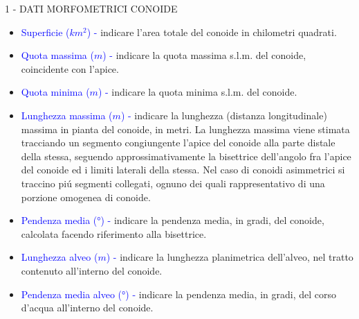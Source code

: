 \documentclass[12pt,a4paper]{article}
\begin{document}
\begin{flushleft}
\vskip 5mm
1 - DATI MORFOMETRICI CONOIDE\\

\begin{itemize}
\item{\textcolor{blue}{Superficie ($km^2$) - }} indicare l'area totale del conoide in chilometri quadrati.
\item{\textcolor{blue}{Quota massima ($m$) - }} indicare la quota massima s.l.m. del conoide, coincidente con l'apice.
\item{\textcolor{blue}{Quota minima ($m$) - }} indicare la quota minima s.l.m. del conoide.
\item{\textcolor{blue}{Lunghezza massima ($m$) - }} indicare la lunghezza (distanza longitudinale) massima in pianta del conoide, in metri. La lunghezza massima viene stimata tracciando un segmento congiungente l'apice del conoide alla parte distale della stessa, seguendo approssimativamente la bisettrice dell'angolo fra l'apice del conoide ed i limiti laterali della stessa. Nel caso di conoidi asimmetrici si traccino pi\'u segmenti collegati, ognuno dei quali rappresentativo di una porzione omogenea di conoide.
\item{\textcolor{blue}{Pendenza media ($°$) - }} indicare la pendenza media, in gradi, del conoide, calcolata facendo riferimento alla bisettrice.
\item{\textcolor{blue}{Lunghezza alveo ($m$) - }} indicare la lunghezza planimetrica dell'alveo, nel tratto contenuto all'interno del conoide.
\item{\textcolor{blue}{Pendenza media alveo ($°$) - }} indicare la pendenza media, in gradi, del corso d'acqua all'interno del conoide.

\end{itemize}



\end{flushleft}
\end{document}
